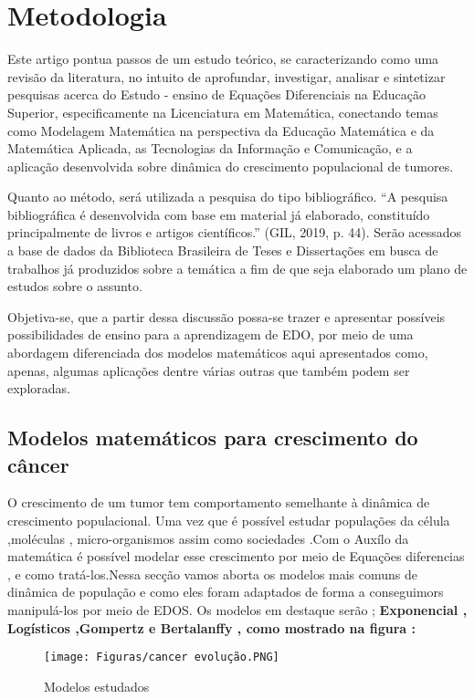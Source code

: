 \section{Metodologia}

Este artigo pontua passos de um estudo teórico, se caracterizando como uma revisão da literatura, no intuito de aprofundar, investigar, analisar e sintetizar pesquisas acerca do Estudo - ensino de Equações Diferenciais na Educação Superior, especificamente na Licenciatura em Matemática, conectando temas como Modelagem Matemática na perspectiva da Educação Matemática e da Matemática Aplicada, as Tecnologias da Informação e Comunicação, e a aplicação desenvolvida sobre dinâmica do crescimento populacional de tumores.

Quanto ao método, será utilizada a pesquisa do tipo bibliográfico. ``A pesquisa bibliográfica é desenvolvida com base em material já elaborado, constituído principalmente de livros e artigos científicos.'' (GIL, 2019, p. 44). Serão acessados a base de dados da Biblioteca Brasileira de Teses e Dissertações em busca de trabalhos já produzidos sobre a temática a fim de que seja elaborado um plano de estudos sobre o assunto.

Objetiva-se, que a partir dessa discussão possa-se trazer e apresentar possíveis possibilidades de ensino para a aprendizagem de EDO, por meio de uma abordagem diferenciada dos modelos matemáticos aqui apresentados como, apenas, algumas aplicações dentre várias outras que também podem ser exploradas.

\subsection{Modelos matemáticos para crescimento do câncer }



O crescimento de um tumor  tem comportamento semelhante à dinâmica de crescimento populacional. Uma vez que é possível estudar populações da célula ,moléculas , micro-organismos assim como sociedades .Com o Auxílo da matemática é  possível modelar esse crescimento por meio de Equações diferencias , e como tratá-los.Nessa secção vamos aborta os modelos mais comuns de dinâmica de população e como eles foram adaptados de forma a conseguimors manipulá-los por meio de EDOS. Os modelos em destaque serão ; \textbf{Exponencial , Logísticos ,Gompertz e Bertalanffy , como mostrado na figura : }


\begin{figure}[!h]
\centering
\caption{Modelos estudados}
\texttt{[image: Figuras/cancer evolução.PNG]}\\

\end{figure}
\newpage
